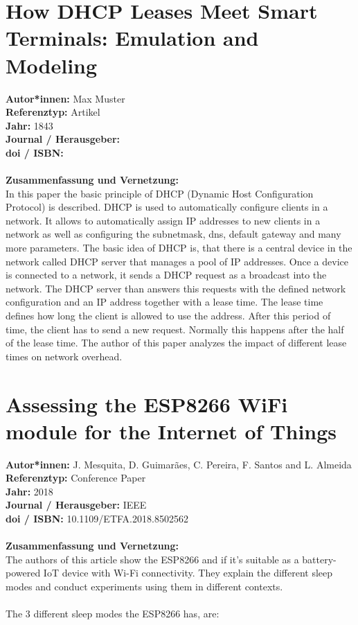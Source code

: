 \documentclass{report}
\begin{document}

{\let\clearpage\relax \chapter{How DHCP Leases Meet Smart Terminals: Emulation and Modeling}}
\noindent
\textbf{Autor*innen:} Max Muster\\
\textbf{Referenztyp:} Artikel\\
\textbf{Jahr:} 1843\\
\textbf{Journal / Herausgeber:}\\
\textbf{doi / ISBN:}\\\\
\textbf{Zusammenfassung und Vernetzung:}\\
In this paper the basic principle of DHCP (Dynamic Host Configuration Protocol) is described. 
DHCP is used to automatically configure clients in a network. 
It allows to automatically assign IP addresses to new clients in a network as well as configuring the subnetmask, dns, default gateway and many more parameters.
The basic idea of DHCP is, that there is a central device in the network called DHCP server that manages a pool of IP addresses.
Once a device is connected to a network, it sends a DHCP request as a broadcast into the network. 
The DHCP server than answers this requests with the defined network configuration and an IP address together with a lease time.
The lease time defines how long the client is allowed to use the address. After this period of time, the client has to send a new request. 
Normally this happens after the half of the lease time.
The author of this paper analyzes the impact of different lease times on network overhead.


{\let\clearpage\relax \chapter{Assessing the ESP8266 WiFi module for the Internet of Things}}
\noindent
\textbf{Autor*innen:} J. Mesquita, D. Guimarães, C. Pereira, F. Santos and L. Almeida\\
\textbf{Referenztyp:} Conference Paper\\
\textbf{Jahr:} 2018\\
\textbf{Journal / Herausgeber:} IEEE\\
\textbf{doi / ISBN:} 10.1109/ETFA.2018.8502562\\\\
\textbf{Zusammenfassung und Vernetzung:}\\
The authors of this article show the ESP8266 and if it's suitable as a battery-powered IoT device with Wi-Fi connectivity.
They explain the different sleep modes and conduct experiments using them in different contexts.\\\\
The 3 different sleep modes the ESP8266 has, are:\\
\end{document}
